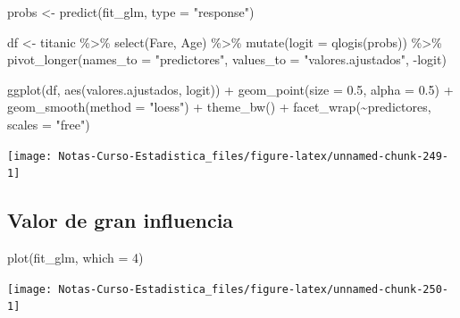 \documentclass[
  12pt,
]{book}
\newenvironment{Shaded}{\begin{snugshade}}{\end{snugshade}}
\newcommand{\AttributeTok}[1]{\textcolor[rgb]{0.77,0.63,0.00}{#1}}
\newcommand{\DecValTok}[1]{\textcolor[rgb]{0.00,0.00,0.81}{#1}}
\newcommand{\FloatTok}[1]{\textcolor[rgb]{0.00,0.00,0.81}{#1}}
\newcommand{\FunctionTok}[1]{\textcolor[rgb]{0.00,0.00,0.00}{#1}}
\newcommand{\NormalTok}[1]{#1}
\newcommand{\OtherTok}[1]{\textcolor[rgb]{0.56,0.35,0.01}{#1}}
\newcommand{\SpecialCharTok}[1]{\textcolor[rgb]{0.00,0.00,0.00}{#1}}
\newcommand{\StringTok}[1]{\textcolor[rgb]{0.31,0.60,0.02}{#1}}
\theoremstyle{definition}
\theoremstyle{definition}
\theoremstyle{definition}
\theoremstyle{remark}
\begin{document}
\begin{Shaded}
\begin{Highlighting}[]
\NormalTok{probs }\OtherTok{\textless{}{-}} \FunctionTok{predict}\NormalTok{(fit\_glm, }\AttributeTok{type =} \StringTok{"response"}\NormalTok{)}

\NormalTok{df }\OtherTok{\textless{}{-}}\NormalTok{ titanic }\SpecialCharTok{\%\textgreater{}\%} \FunctionTok{select}\NormalTok{(Fare, Age) }\SpecialCharTok{\%\textgreater{}\%} \FunctionTok{mutate}\NormalTok{(}\AttributeTok{logit =} \FunctionTok{qlogis}\NormalTok{(probs)) }\SpecialCharTok{\%\textgreater{}\%} 
    \FunctionTok{pivot\_longer}\NormalTok{(}\AttributeTok{names\_to =} \StringTok{"predictores"}\NormalTok{, }\AttributeTok{values\_to =} \StringTok{"valores.ajustados"}\NormalTok{, }
        \SpecialCharTok{{-}}\NormalTok{logit)}


\FunctionTok{ggplot}\NormalTok{(df, }\FunctionTok{aes}\NormalTok{(valores.ajustados, logit)) }\SpecialCharTok{+} \FunctionTok{geom\_point}\NormalTok{(}\AttributeTok{size =} \FloatTok{0.5}\NormalTok{, }
    \AttributeTok{alpha =} \FloatTok{0.5}\NormalTok{) }\SpecialCharTok{+} \FunctionTok{geom\_smooth}\NormalTok{(}\AttributeTok{method =} \StringTok{"loess"}\NormalTok{) }\SpecialCharTok{+} 
    \FunctionTok{theme\_bw}\NormalTok{() }\SpecialCharTok{+} \FunctionTok{facet\_wrap}\NormalTok{(}\SpecialCharTok{\textasciitilde{}}\NormalTok{predictores, }\AttributeTok{scales =} \StringTok{"free"}\NormalTok{)}
\end{Highlighting}
\end{Shaded}

\begin{center}\texttt{[image: Notas-Curso-Estadistica\_files/figure-latex/unnamed-chunk-249-1]} \end{center}

\hypertarget{valor-de-gran-influencia}{%
\subsection{Valor de gran influencia}\label{valor-de-gran-influencia}}

\begin{Shaded}
\begin{Highlighting}[]
\FunctionTok{plot}\NormalTok{(fit\_glm, }\AttributeTok{which =} \DecValTok{4}\NormalTok{)}
\end{Highlighting}
\end{Shaded}

\begin{center}\texttt{[image: Notas-Curso-Estadistica\_files/figure-latex/unnamed-chunk-250-1]} \end{center}
\end{document}
